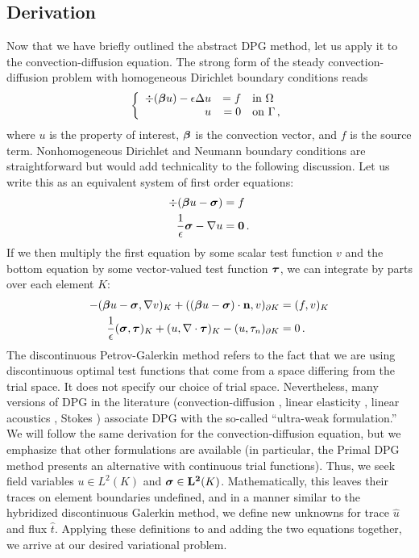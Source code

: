 \documentclass[Proposal.tex]{subfiles}
\begin{document}
\subsection{Derivation}
Now that we have briefly outlined the abstract DPG method, let us apply it to
the convection-diffusion equation. The strong form of the steady
convection-diffusion problem with homogeneous Dirichlet boundary conditions reads
\[
\left\{
\begin{array}[c]{rrl}
\div(\boldsymbol\beta u)-\epsilon\Delta u & =f & \text{in }\Omega\\
u & =0 & \text{on }\Gamma\,,
\end{array}
\right.
\]
where $u$ is the property of interest, $\boldsymbol{\beta}$ is the convection vector,
and $f$ is the source term. Nonhomogeneous Dirichlet and Neumann boundary
conditions are straightforward but would add technicality to the following
discussion. Let us write this as an equivalent system of first
order equations:
\begin{align*}
\div(\boldsymbol\beta u-\boldsymbol\sigma)&=f\\
\frac{1}{\epsilon}\boldsymbol\sigma-\nabla u&=\boldsymbol{0}\,.
\end{align*}
If we then multiply the first equation by some scalar test function $v$ and the
bottom equation by some vector-valued test function $\boldsymbol\tau$, we can integrate by
parts over each element $K$:
\begin{equation}
\label{eq:preultraweak}
\begin{aligned}
-(\boldsymbol\beta u-\boldsymbol\sigma,\nabla v)_K+((\boldsymbol\beta
u-\boldsymbol\sigma)\cdot\mathbf{n},v)_{\partial K}&=(f,v)_K\\
\frac{1}{\epsilon}(\boldsymbol\sigma,\boldsymbol\tau)_K+(u,\nabla\cdot\boldsymbol\tau)_K
-(u,\tau_n)_{\partial K}&=0\,.
\end{aligned}
\end{equation}
The discontinuous Petrov-Galerkin method refers to the fact that we are using
discontinuous optimal test functions that come from a space differing from the
trial space. It does not specify our choice of trial space. Nevertheless, many
versions of DPG in the literature (convection-diffusion \cite{DPG6},
linear elasticity \cite{BramwellDemkowiczGopalakrishnanQiu11}, linear
acoustics \cite{DemkowiczGopalakrishnanMugaZitelli12}, Stokes
\cite{DPGStokes}) associate DPG with the so-called ``ultra-weak formulation.''
We will follow the same derivation for the convection-diffusion equation, but
we emphasize that other formulations are available (in particular, the
Primal DPG\cite{PrimalDPG} method presents an alternative with
continuous trial functions). Thus, we seek field variables $u\in L^2(K)$ and
$\boldsymbol\sigma\in\mathbf{L^2}(K)$. Mathematically, this leaves their traces on element
boundaries undefined, and in a manner similar to the hybridized discontinuous
Galerkin method, we define new unknowns for trace $\hat u$ and flux $\hat t$.
Applying these definitions to  and adding the two
equations together, we arrive at our desired variational problem.
\end{document}
